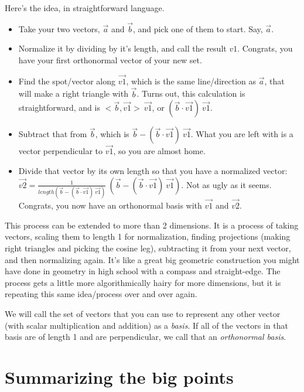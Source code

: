 \documentclass[
]{book}
\providecommand{\tightlist}{%
  \setlength{\itemsep}{0pt}\setlength{\parskip}{0pt}}
\begin{document}
Here's the idea, in straightforward language.

\begin{itemize}
\tightlist
\item
  Take your two vectors, \(\vec{a}\) and \(\vec{b}\), and pick one of them to start. Say, \(\vec{a}\).
\item
  Normalize it by dividing by it's length, and call the result \(v1\). Congrats, you have your first orthonormal vector of your new set.
\item
  Find the spot/vector along \(\vec{v1}\), which is the same line/direction as \(\vec{a}\), that will make a right triangle with \(\vec{b}\). Turns out, this calculation is straightforward, and is \(<\vec{b},\vec{v1}>\ \vec{v1}\), or \((\vec{b}\cdot\vec{v1})\ \vec{v1}\).
\item
  Subtract that from \(\vec{b}\), which is \(\vec{b} - (\vec{b}\cdot\vec{v1})\ \vec{v1}\). What you are left with is a vector perpendicular to \(\vec{v1}\), so you are almost home.
\item
  Divide that vector by its own length so that you have a normalized vector: \(\vec{v2} = \frac{1}{length(\vec{b} - (\vec{b}\cdot\vec{v1})\ \vec{v1})}\ (\vec{b} - (\vec{b}\cdot\vec{v1})\ \vec{v1})\). Not as ugly as it seems. Congrats, you now have an orthonormal basis with \(\vec{v1}\) and \(\vec{v2}\).
\end{itemize}

This process can be extended to more than 2 dimensions. It is a process of taking vectors, scaling them to length 1 for normalization, finding projections (making right triangles and picking the cosine leg), subtracting it from your next vector, and then normalizing again. It's like a great big geometric construction you might have done in geometry in high school with a compass and straight-edge. The process gets a little more algorithmically hairy for more dimensions, but it is repeating this same idea/process over and over again.

We will call the set of vectors that you can use to represent any other vector (with scalar multiplication and addition) as a \emph{basis}. If all of the vectors in that basis are of length 1 and are perpendicular, we call that an \emph{orthonormal basis}.

\hypertarget{summarizing-the-big-points}{%
\section{Summarizing the big points}\label{summarizing-the-big-points}}
\end{document}
